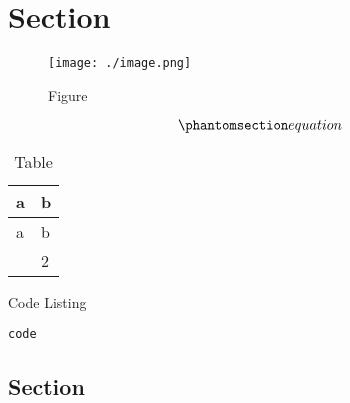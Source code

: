 \section{Section}\label{section}

\begin{figure}
\label{fig:1}
\centering
\texttt{[image: ./image.png]}
\caption{Figure}\label{fig:1}
\end{figure}

\begin{equation}\phantomsection\label{eq:1}{equation}\label{eq:1}\end{equation}

\label{tbl:1}
\begin{longtable}[]{@{}ll@{}}
\caption{\label{tbl:1}Table}\tabularnewline
\toprule\noalign{}
a & b \\
\midrule\noalign{}
\endfirsthead
\toprule\noalign{}
a & b \\
\midrule\noalign{}
\endhead
\bottomrule\noalign{}
\endlastfoot
1 & 2 \\
\end{longtable}

\begin{codelisting}

\caption{Code Listing}

\label{lst:1}%
\begin{verbatim}
code
\end{verbatim}

\end{codelisting}

\subsection{Section}\label{section-1}
